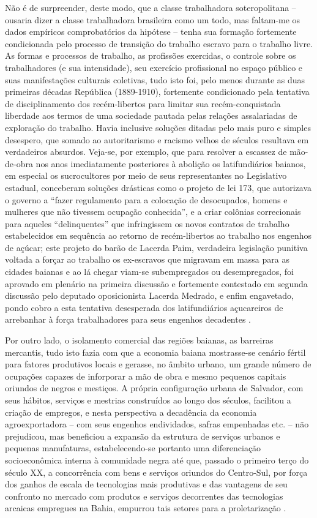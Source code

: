 Não é de surpreender, deste modo, que a classe trabalhadora soteropolitana -- ousaria dizer a classe trabalhadora brasileira como um todo, mas faltam-me os dados empíricos comprobatórios da hipótese -- tenha sua formação fortemente condicionada pelo processo de transição do trabalho escravo para o trabalho livre. As formas e processos de trabalho, as profissões exercidas, o controle sobre os trabalhadores (e sua intensidade), seu exercício profissional no espaço público e suas manifestações culturais coletivas, tudo isto foi, pelo menos durante as duas primeiras décadas República (1889-1910), fortemente condicionado pela tentativa de disciplinamento dos recém-libertos para limitar sua recém-conquistada liberdade aos termos de uma sociedade pautada pelas relações assalariadas de exploração do trabalho. Havia inclusive soluções ditadas pelo mais puro e simples desespero, que somado ao autoritarismo e racismo velhos de séculos resultava em verdadeiros absurdos. Veja-se, por exemplo, que para resolver a escassez de mão-de-obra nos anos imediatamente posteriores à abolição os latifundiários baianos, em especial os sucrocultores por meio de seus representantes no Legislativo estadual, conceberam soluções drásticas como o projeto de lei 173, que autorizava o governo a ``fazer regulamento para a colocação de desocupados, homens e mulheres que não tivessem ocupação conhecida'', e a criar colônias correcionais para aqueles ``delinquentes'' que infringissem os novos contratos de trabalho estabelecidos em sequência ao retorno de recém-libertos ao trabalho nos engenhos de açúcar; este projeto do barão de Lacerda Paim, verdadeira legislação punitiva voltada a forçar ao trabalho os ex-escravos que migravam em massa para as cidades baianas e ao lá chegar viam-se subempregados ou desempregados, foi aprovado em plenário na primeira discussão e fortemente contestado em segunda discussão pelo deputado oposicionista Lacerda Medrado, e enfim engavetado, pondo cobro a esta tentativa desesperada dos latifundiários açucareiros de arrebanhar à força trabalhadores para seus engenhos decadentes \cite[pp.~73-74]{sampaio_legislativo_1985}.

Por outro lado, o isolamento comercial das regiões baianas, as barreiras mercantis, tudo isto fazia com que a economia baiana mostrasse-se cenário fértil para fatores produtivos locais e gerasse, no âmbito urbano, um grande número de ocupações capazes de inforporar a mão de obra e mesmo pequenos capitais oriundos de negros e mestiços. A própria configuração urbana de Salvador, com seus hábitos, serviços e mestrias construídos ao longo dos séculos, facilitou a criação de empregos, e nesta perspectiva a decadência da economia agroexportadora -- com seus engenhos endividados, safras empenhadas etc. -- não prejudicou, mas beneficiou a expansão da estrutura de serviços urbanos e pequenas manufaturas, estabelecendo-se portanto uma diferenciação socioeconômica interna à comunidade negra até que, passado o primeiro terço do século XX, a concorrência com bens e serviços oriundos do Centro-Sul, por força dos ganhos de escala de tecnologias mais produtivas e das vantagens de seu confronto no mercado com produtos e serviços decorrentes das tecnologias arcaicas empregues na Bahia, empurrou tais setores para a proletarização \cite[pp.~71-72]{sodre_terreiro_1988}.

